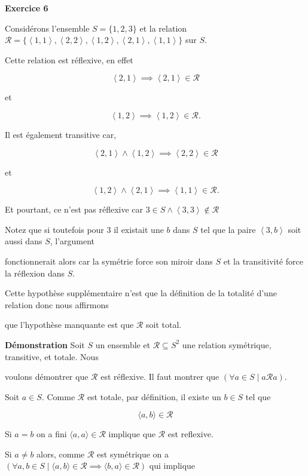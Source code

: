 \documentclass{article}
\newcommand{\tuple}[1]{\ensuremath{\left\langle #1 \right\rangle}}
\begin{document}
\textbf{Exercice 6}

\vspace{0.5cm}

Considérons l'ensemble $S = \{ 1, 2, 3 \}$ et la relation $\mathcal{R}=\{ \tuple{1,1}, \tuple{2,2},\tuple{1,2},\tuple{2,1},\tuple{1,1} \}$ sur $S$. 

Cette relation est réflexive, en effet

$$\tuple{2,1} \implies \tuple{2,1} \in \mathcal{R}$$

et

$$\tuple{1,2} \implies \tuple{1,2} \in \mathcal{R}.$$

Il est également transitive car,

$$\tuple{2,1} \land \tuple{1,2} \implies \tuple{2,2} \in \mathcal{R}$$

et

$$\tuple{1,2} \land \tuple{2,1}\implies \tuple{1,1} \in \mathcal{R}.$$

Et pourtant, ce n'est pas réflexive car $ 3 \in S \land \tuple{3,3} \notin \mathcal{R} $ 

\vspace{0.5cm}

Notez que si toutefois pour $3$ il existait une $b$ dans $S$ tel que la paire $\tuple{3,b}$ soit aussi dans $S$, l’argument 

fonctionnerait alors car la symétrie force son miroir dans $S$ et la transitivité force la réflexion dans $S$.

Cette hypothèse supplémentaire n'est que la définition de la totalité d'une relation donc nous affirmons 

que l’hypothèse manquante est que $\mathcal{R}$ soit total.

\vspace{0.5cm}

\textbf{Démonstration} Soit \(S\) un ensemble et \(\mathcal{R} \subseteq S^2\) une relation symétrique, transitive, et totale. Nous 

voulons démontrer que \( \mathcal{R} \) est réflexive. Il faut montrer que $ ( \forall a \in S \mid a \mathcal{R} a)$.

Soit \(a \in S\). Comme \( \mathcal{R} \) est totale, par définition, il existe un \(b \in S\) tel que 

$$ \langle a, b \rangle \in \mathcal{R} $$

Si $a = b$ on a fini $ \langle a,a \rangle \in \mathcal{R}$ implique que $ \mathcal{R}$ est reflexive.

Si $a \neq b$ alors, comme $ \mathcal{R} $ est symétrique on a $(\forall a,b \in S \mid \langle a,b \rangle \in \mathcal{R} \implies \langle b,a \rangle \in \mathcal{R} )$ qui implique
\end{document}
